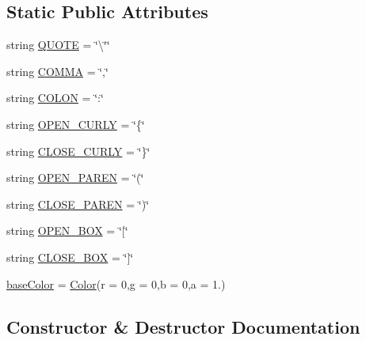 \subsection*{Static Public Attributes}
\begin{DoxyCompactItemize}
\item 
string \mbox{\hyperlink{class_bridges_1_1_color_grid_1_1_color_grid_a002fefeb0638ed945322a41c386a5a77}{Q\+U\+O\+TE}} = \char`\"{}\textbackslash{}\char`\"{}\char`\"{}
\item 
string \mbox{\hyperlink{class_bridges_1_1_color_grid_1_1_color_grid_acf1127c478d1982039ba2a40ae4cca77}{C\+O\+M\+MA}} = \char`\"{},\char`\"{}
\item 
string \mbox{\hyperlink{class_bridges_1_1_color_grid_1_1_color_grid_a58499f4301d3108ce3347832d5500879}{C\+O\+L\+ON}} = \char`\"{}\+:\char`\"{}
\item 
string \mbox{\hyperlink{class_bridges_1_1_color_grid_1_1_color_grid_a90f35bbd4c3d1fe9a4968592c11a1656}{O\+P\+E\+N\+\_\+\+C\+U\+R\+LY}} = \char`\"{}\{\char`\"{}
\item 
string \mbox{\hyperlink{class_bridges_1_1_color_grid_1_1_color_grid_ae2e480f319d0f7836737f319965a5f2d}{C\+L\+O\+S\+E\+\_\+\+C\+U\+R\+LY}} = \char`\"{}\}\char`\"{}
\item 
string \mbox{\hyperlink{class_bridges_1_1_color_grid_1_1_color_grid_a9987810ba393470f5a995736e74d22bc}{O\+P\+E\+N\+\_\+\+P\+A\+R\+EN}} = \char`\"{}(\char`\"{}
\item 
string \mbox{\hyperlink{class_bridges_1_1_color_grid_1_1_color_grid_a68f4bd26cd46559b44cd735396e6c132}{C\+L\+O\+S\+E\+\_\+\+P\+A\+R\+EN}} = \char`\"{})\char`\"{}
\item 
string \mbox{\hyperlink{class_bridges_1_1_color_grid_1_1_color_grid_a46229b36208156dfe062b41804cf1416}{O\+P\+E\+N\+\_\+\+B\+OX}} = \char`\"{}\mbox{[}\char`\"{}
\item 
string \mbox{\hyperlink{class_bridges_1_1_color_grid_1_1_color_grid_ad521dc693bd68060060adb3cbee2d5c1}{C\+L\+O\+S\+E\+\_\+\+B\+OX}} = \char`\"{}\mbox{]}\char`\"{}
\item 
\mbox{\hyperlink{class_bridges_1_1_color_grid_1_1_color_grid_a1ea984f1d35cc7c0da84bfb5c8b17ade}{base\+Color}} = \mbox{\hyperlink{class_bridges_1_1_color_1_1_color}{Color}}(r = 0,g = 0,b = 0,a = 1.)
\end{DoxyCompactItemize}


\subsection{Constructor \& Destructor Documentation}
\mbox{\label{class_bridges_1_1_color_grid_1_1_color_grid_abe3330968006d02bf8eecdb73109fffc}} 

